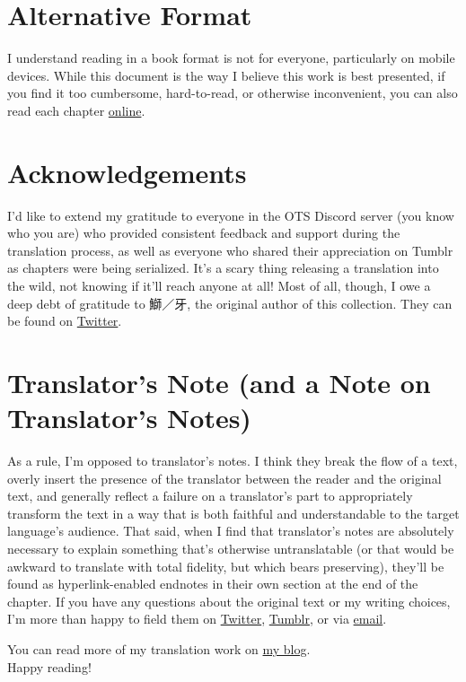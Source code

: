 \section*{Alternative Format}
I understand reading in a book format is not for everyone, particularly on mobile devices. While this document is the way I believe this work is best presented, if you find it too cumbersome, hard-to-read, or otherwise inconvenient, you can also read each chapter \href{https://lynne.bearblog.dev/blog/?q=octo84}{online}.

\section*{Acknowledgements}
I'd like to extend my gratitude to everyone in the OTS Discord server (you know who you are) who provided consistent feedback and support during the translation process, as well as everyone who shared their appreciation on Tumblr as chapters were being serialized. It's a scary thing releasing a translation into the wild, not knowing if it'll reach anyone at all! Most of all, though, I owe a deep debt of gratitude to 鰤／牙, the original author of this collection. They can be found on \href{https://twitter.com/kiva_blitz}{Twitter}.

\section*{Translator's Note (and a Note on Translator's Notes)}
As a rule, I'm opposed to translator's notes. I think they break the flow of a text, overly insert the presence of the translator between the reader and the original text, and generally reflect a failure on a translator's part to appropriately transform the text in a way that is both faithful and understandable to the target language's audience. That said, when I find that translator's notes are absolutely necessary to explain something that's otherwise untranslatable (or that would be awkward to translate with total fidelity, but which bears preserving), they'll be found as hyperlink-enabled endnotes in their own section at the end of the chapter.
If you have any questions about the original text or my writing choices, I'm more than happy to field them on \href{https://twitter.com/plvpwaa}{Twitter}, \href{https://plvpwaa.tumblr.com}{Tumblr}, or via \href{mailto:plvpwaa@lynnux.org}{email}.

You can read more of my translation work on \href{https://lynne.bearblog.dev}{my blog}.
\\

Happy reading!